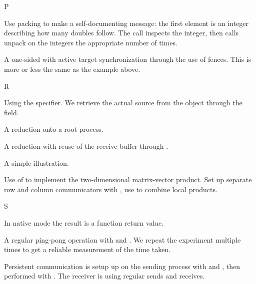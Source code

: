  {P}

%
Use packing to make a self-documenting message: the first element is
an integer describing how many doubles follow. The
 call inspects the integer, then calls unpack
on the integers the appropriate number of times.
%


A one-sided  with active target synchronization
through the use of fences. This is more or less the same as the
 example above.
%
%

 {R}


Using the  specifier. We retrieve the
actual source from the  object through the
 field.
%
%


A reduction onto a root process.
%

A reduction with reuse of the receive buffer through
.
%


A simple illustration.
%

Use of  to implement the two-dimensional
matrix-vector product.
Set up separate row and column communicators with
, use  to combine
local products.
%

 {S}


In native mode the result is a function return value.
%


A regular ping-pong operation with  and
. We repeat the experiment multiple times to
get a reliable measurement of the time taken.
%
%
%


Persistent communication is setup up on the sending process with
 and , then
performed with . The receiver is using
regular sends and receives.
%
%

